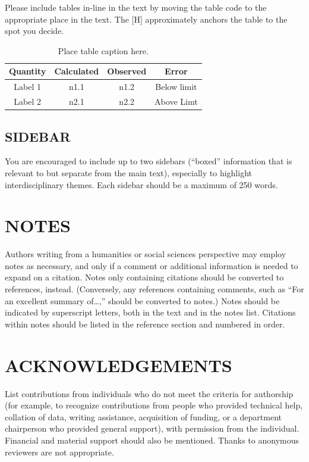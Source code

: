 \documentclass[12pt]{article}
\begin{document}
Please include tables in-line in the text by moving the table code to the appropriate place in the text. The [H] approximately anchors the table to the spot you decide.
\begin{table}[H]
	\centering
	\begin{tabular}{|c|c|c|c|}\hline
		\textbf{Quantity} & \textbf{Calculated} & \textbf{Observed} & \textbf{Error} \\ \hline
		Label 1 & n1.1 & n1.2 & Below limit \\ \hline
		Label 2 & n2.1 & n2.2 & Above Limt \\ \hline
	\end{tabular}
	\caption{\label{tbl1} Place table caption here.}
\end{table}






\subsection*{\sffamily \large SIDEBAR}

You are encouraged to include up to two sidebars (“boxed” information that is relevant to but separate from the main text), especially to highlight interdisciplinary themes. Each sidebar should be a maximum of 250 words.

\section*{\sffamily \Large NOTES}
Authors writing from a humanities or social sciences perspective may employ notes as necessary, and only if a comment or additional information is needed to expand on a citation. Notes only containing citations should be converted to references, instead. (Conversely, any references containing comments, such as “For an excellent summary of…,” should be converted to notes.) Notes should be indicated by superscript letters, both in the text and in the notes list. Citations within notes should be listed in the reference section and numbered in order.

\section*{\sffamily \Large ACKNOWLEDGEMENTS}
List contributions from individuals who do not meet the criteria for authorship (for example, to recognize contributions from people who provided technical help, collation of data, writing assistance, acquisition of funding, or a department chairperson who provided general support), with permission from the individual. Financial and material support should also be mentioned. Thanks to anonymous reviewers are not appropriate.
\end{document}
